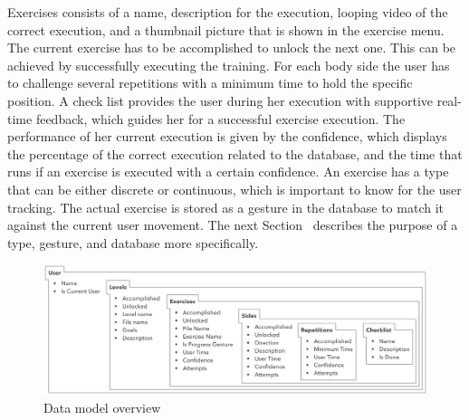 Exercises consists of a name, description for the execution, looping video of the correct execution, and a thumbnail picture that is shown in the exercise menu.
The current exercise has to be accomplished to unlock the next one.
This can be achieved by successfully executing the training.
For each body side the user has to challenge several repetitions with a minimum time to hold the specific position.
A check list provides the user during her execution with supportive real-time feedback, which guides her for a successful exercise execution.
The performance of her current execution is given by the confidence, which displays the percentage of the correct execution related to the database, and the time that runs if an exercise is executed with a certain confidence.
An exercise has a type that can be either discrete or continuous, which is important to know for the user tracking. 
The actual exercise is stored as a gesture in the database to match it against the current user movement.
The next Section~\textit{} describes the purpose of a type, gesture, and database more specifically.

\begin{figure}[htb]
	\centering
	\begin{minipage}[t]{1\linewidth}
		\centering
		\includegraphics[width=1\linewidth]{Pictures/5_2_dataModel}
		\caption{Data model overview}
		\label{fig:5_2_dataModel}
	\end{minipage}
\end{figure}

